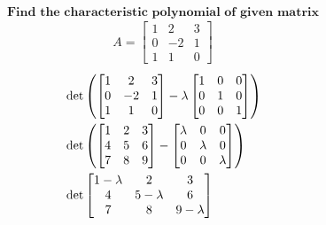 \documentclass[10pt]{article}
\begin{document}
\pagebreak
\[ \textbf{Find the characteristic polynomial of given matrix} \] 
\begin{equation} 
\begin{aligned}
    A= \begin{bmatrix}
    1 & 2 & 3\\
    0 & -2 & 1\\
    1 & 1 & 0 
    \end{bmatrix}  \nonumber
\end{aligned}
\end{equation}
\begin{equation} 
\begin{aligned}
    & \det \left( \begin{bmatrix}
    1 & 2 & 3\\
    0 & -2 & 1\\
    1 & 1 & 0 
    \end{bmatrix} - 
    \lambda
    \begin{bmatrix}
    1 & 0 & 0\\
    0 & 1 & 0\\
    0 & 0 & 1 
    \end{bmatrix} \right) \\  
    \newline 
    & \det \left( \begin{bmatrix}
    1 & 2 & 3\\
    4 & 5 & 6\\
    7 & 8 & 9 
    \end{bmatrix} - 
    \begin{bmatrix}
    \lambda & 0 & 0\\
    0 & \lambda & 0\\
    0 & 0 & \lambda 
    \end{bmatrix} \right)   \\  
    \newline 
    & \det \begin{bmatrix}
    1 - \lambda & 2 & 3\\
    4 & 5 - \lambda & 6\\
    7 & 8 & 9 - \lambda  
    \end{bmatrix}  \nonumber \\ 
\end{aligned}
\end{equation}
\end{document}
